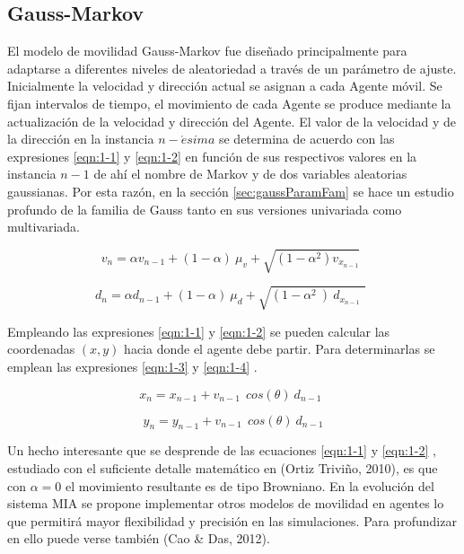 \subsection{Gauss-Markov}
El modelo de movilidad Gauss-Markov fue diseñado principalmente para adaptarse a diferentes niveles de aleatoriedad a través de un parámetro de ajuste. Inicialmente la velocidad y dirección actual se asignan a cada Agente móvil. Se fijan   intervalos de tiempo, el movimiento de cada Agente se produce mediante la actualización de la velocidad y dirección del Agente.  El valor de la velocidad y de la dirección en la instancia $n-\acute{e}sima$  se determina de acuerdo con las expresiones \ref{eqn:1-1} y \ref{eqn:1-2} en función de sus respectivos valores en la instancia $n-1$   de ahí el nombre de Markov y de dos variables aleatorias gaussianas.  Por esta razón, en la sección \ref{sec:gaussParamFam} se hace un estudio profundo de la familia de Gauss tanto en sus versiones univariada como multivariada. 

\begin{equation}
v_n=\alpha v_{n-1}+(1-\alpha)\ \mu_v+\sqrt{(1-\alpha^2) v_{x_{n-1}}}\ \ 
\label{eqn:1-1}
\end{equation}

\begin{equation}
d_n=\alpha d_{n-1}+(1-\alpha)\ \mu_d+\sqrt{(1-\alpha^2\ )\ d_{x_{n-1}\ }\ }\ \ 
\label{eqn:1-2}
\end{equation}

Empleando las expresiones \ref{eqn:1-1}  y \ref{eqn:1-2} se pueden calcular las coordenadas $(x,y)$  hacia donde el agente debe partir.  Para determinarlas se emplean las expresiones \ref{eqn:1-3} y \ref{eqn:1-4} .

\begin{equation}
x_n=x_{n-1}+v_{n-1}\ \ cos(\theta)\ d_{n-1}\ \ 
\label{eqn:1-3}
\end{equation}


\begin{equation}
y_n=y_{n-1}+v_{n-1}\ \ cos(\theta)\ d_{n-1} 
\label{eqn:1-4}
\end{equation}

Un hecho interesante que se desprende de las ecuaciones \ref{eqn:1-1} y \ref{eqn:1-2} , estudiado con el suficiente detalle matemático en (Ortiz Triviño, 2010), es que con $\alpha=0$  el movimiento resultante es de tipo Browniano.
En la evolución del sistema MIA se propone implementar otros modelos de movilidad en agentes lo que permitirá mayor flexibilidad y precisión en las simulaciones.  Para profundizar en ello puede verse también (Cao \& Das, 2012).


